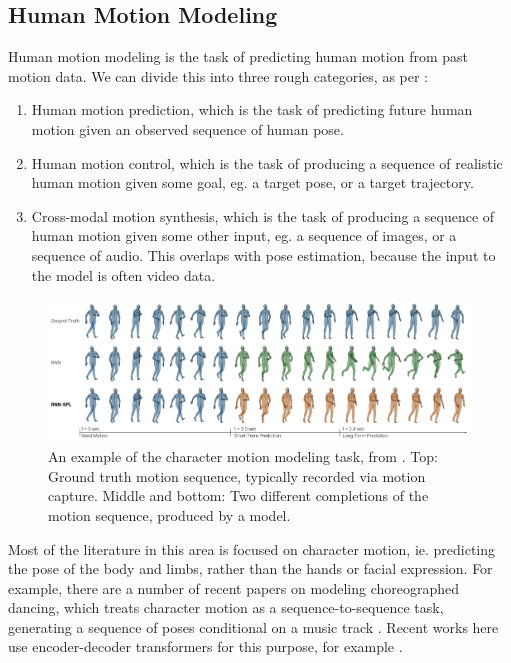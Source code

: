 \subsection{Human Motion Modeling}
\label{ss:human-motion-modeling}

Human motion modeling is the task of predicting human motion from past motion data. We can divide this into three rough categories, as per \cite{human-motion-modeling-survey}:
\begin{enumerate}
    \item Human motion prediction, which is the task of predicting future human motion given an observed sequence of human pose.
    \item Human motion control, which is the task of producing a sequence of realistic human motion given some goal, eg. a target pose, or a target trajectory.
    \item Cross-modal motion synthesis, which is the task of producing a sequence of human motion given some other input, eg. a sequence of images, or a sequence of audio. This overlaps with pose estimation, because the input to the model is often video data.
\end{enumerate}

\begin{figure}
    \includegraphics[width=\linewidth]{figures/character-motion-modeling.png}
    \captionsetup{parskip=7pt}
    \caption[Character motion modeling]{An example of the character motion modeling task, from \cite{structured-prediction}. Top: Ground truth motion sequence, typically recorded via motion capture. Middle and bottom: Two different completions of the motion sequence, produced by a model.}
    \hrulefill
    \label{fig:character-motion-modeling}
\end{figure}

Most of the literature in this area is focused on character motion, ie. predicting the pose of the body and limbs, rather than the hands or facial expression. For example, there are a number of recent papers on modeling choreographed dancing, which treats character motion as a sequence-to-sequence task, generating a sequence of poses conditional on a music track \cite{dance-choreonet}. Recent works here use encoder-decoder transformers for this purpose, for example \cite{dance-transflower}.

